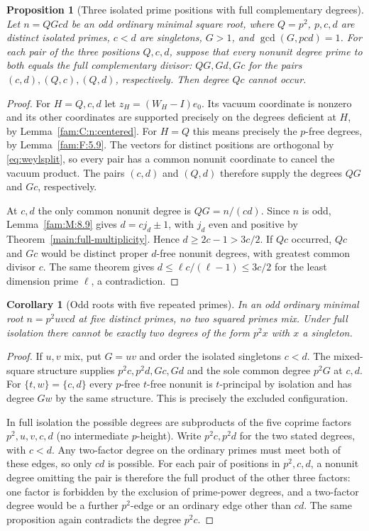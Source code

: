 \documentclass[11pt,a4paper]{article}
\numberwithin{equation}{section}
\newtheorem{proposition}[theorem]{Proposition}
\newtheorem{corollary}[theorem]{Corollary}
\theoremstyle{remark}
\begin{document}
\begin{proposition}[Three isolated prime positions with full complementary degrees]\label{fam:C:2.2}\label{fam:C:n:f15:three-corners}
Let $n=QGcd$ be an odd ordinary minimal square root, where
$Q=p^2$, $p,c,d$ are distinct isolated primes, $c<d$ are
singletons, $G>1$, and $\gcd(G,pcd)=1$. For each pair of the three
positions $Q,c,d$, suppose that every nonunit degree prime to both
equals the full complementary divisor: $QG,Gd,Gc$ for the pairs
$(c,d),(Q,c),(Q,d)$, respectively. Then degree $Qc$ cannot occur.
\end{proposition}
\begin{proof}
For $H=Q,c,d$ let $z_H=(W_H-I)e_0$. Its vacuum coordinate is
nonzero and its other coordinates are supported precisely on the
degrees deficient at $H$, by Lemma~\ref{fam:C:n:centered}. For $H=Q$
this means precisely the $p$-free degrees, by Lemma~\ref{fam:F:5.9}.
The vectors for distinct positions are orthogonal by
\eqref{eq:weylsplit}, so every pair has a common nonunit coordinate
to cancel the vacuum product. The pairs $(c,d)$ and $(Q,d)$ therefore
supply the degrees $QG$ and $Gc$, respectively.

At $c,d$ the only common nonunit degree is $QG=n/(cd)$. Since $n$
is odd, Lemma~\ref{fam:M:8.9} gives $d=cj_d\pm1$, with $j_d$ even
and positive by Theorem~\ref{main:full-multiplicity}. Hence
$d\ge2c-1>3c/2$. If $Qc$ occurred, $Qc$ and $Gc$ would be distinct
proper $d$-free nonunit degrees, with greatest common divisor $c$.
The same theorem gives $d\le\ell c/(\ell-1)\le3c/2$ for the least
dimension prime $\ell$, a contradiction.
\end{proof}

\begin{corollary}[Odd roots with five repeated primes]\label{fam:C:2.3}\label{fam:C:n:f15:odd-mixed}
In an odd ordinary minimal root $n=p^2uvcd$ at five distinct
primes, no two squared primes mix. Under full isolation there
cannot be exactly two degrees of the form $p^2x$ with $x$ a singleton.
\end{corollary}
\begin{proof}
If $u,v$ mix, put $G=uv$ and order the isolated singletons
$c<d$. The mixed-square structure supplies $p^2c,p^2d,Gc,Gd$
and the sole common degree $p^2G$ at $c,d$. For
$\{t,w\}=\{c,d\}$ every $p$-free $t$-free nonunit is $t$-principal
by isolation and has degree $Gw$ by the same structure. This is
precisely the excluded configuration.

In full isolation the possible degrees are subproducts of the
five coprime factors $p^2,u,v,c,d$ (no intermediate $p$-height).
Write $p^2c,p^2d$ for the two stated degrees, with $c<d$.
Any two-factor degree on the ordinary primes must meet both of
these edges, so only $cd$ is possible. For each pair of positions
in $p^2,c,d$, a nonunit degree omitting the pair is therefore the
full product of the other three factors: one factor is forbidden
by the exclusion of prime-power degrees, and a two-factor degree
would be a further $p^2$-edge or an ordinary edge other than $cd$.
The same proposition again contradicts the degree $p^2c$.
\end{proof}
\end{document}
